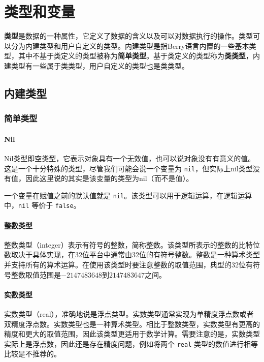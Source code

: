 \chapter{类型和变量}

\textbf{类型}是数据的一种属性，它定义了数据的含义以及可以对数据执行的操作。类型可以分为内建类型和用户自定义的类型。内建类型是指Berry语言内置的一些基本类型，其中不基于类定义的类型被称为\textbf{简单类型}。基于类定义的类型称为\textbf{类类型}，内建类型有一些属于类类型，用户自定义的类型也是类类型。

\section{内建类型}

\subsection{简单类型}

\subsubsection{Nil}

Nil类型即空类型，它表示对象具有一个无效值，也可以说对象没有有意义的值。这是一个十分特殊的类型，尽管我们可能会说一个变量为 \texttt{nil}，但实际上nil类型没有值，因此这里说的其实是该变量的类型为nil（而不是值）。

一个变量在赋值之前的默认值就是 \texttt{nil}。该类型可以用于逻辑运算，在逻辑运算中，\texttt{nil} 等价于 \texttt{false}。

\subsubsection{整数类型}

整数类型（integer）表示有符号的整数，简称整数。该类型所表示的整数的比特位数取决于具体实现，在32位平台中通常由32位的有符号整数。整数是一种算术类型并支持所有的算术运算。在使用该类型时要注意整数的取值范围，典型的32位有符号整数取值范围是$-2147483648$到$2147483647$之间。

\subsubsection{实数类型}

实数类型（real），准确地说是浮点类型。实数类型通常实现为单精度浮点数或者双精度浮点数。实数类型也是一种算术类型。相比于整数类型，实数类型有更高的精度和更大的取值范围，因此该类型更适用于数学计算。需要注意的是，实数类型实际上是浮点数，因此还是存在精度问题，例如将两个 \texttt{real} 类型的数值进行相等比较是不推荐的。

